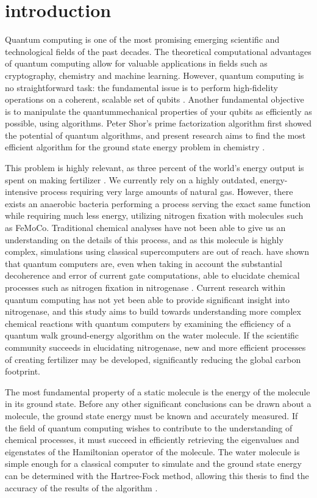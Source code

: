 \chapter{introduction}

Quantum computing is one of the most promising emerging scientific and technological fields of the past decades. The theoretical computational advantages of quantum computing allow for valuable applications in fields such as cryptography, chemistry and machine learning. However, quantum computing is no straightforward task: the fundamental issue is to perform high-fidelity operations on a coherent, scalable set of qubits \cite{malley}. Another fundamental objective is to manipulate the quantummechanical properties of your qubits as efficiently as possible, using algorithms. Peter Shor's prime factorization algorithm first showed the potential of quantum algorithms, and present research aims to find the most efficient algorithm for the ground state energy problem in chemistry \cite{shor}.


This problem is highly relevant, as three percent of the world's energy output is spent on making fertilizer \cite{reiher}. We currently rely on a highly outdated, energy-intensive process requiring very large amounts of natural gas. However, there exists an anaerobic bacteria performing a process serving the exact same function while requiring much less energy, utilizing nitrogen fixation with molecules such as FeMoCo. Traditional chemical analyses have not been able to give us an understanding on the details of this process, and as this molecule is highly complex, simulations using classical supercomputers are out of reach. \textcite{reiher} have shown that quantum computers are, even when taking in account the substantial decoherence and error of current gate computations, able to elucidate chemical processes such as nitrogen fixation in nitrogenase \cite{reiher}. Current research within quantum computing has not yet been able to provide significant insight into nitrogenase, and this study aims to build towards understanding more complex chemical reactions with quantum computers by examining the efficiency of a quantum walk ground-energy algorithm on the water molecule. If the scientific community succeeds in elucidating nitrogenase, new and more efficient processes of creating fertilizer may be developed, significantly reducing the global carbon footprint.


The most fundamental property of a static molecule is the energy of the  molecule in its ground state. Before any other significant conclusions can be drawn about a molecule, the ground state energy must be known and accurately measured. If the field of quantum computing wishes to contribute to the understanding of chemical processes, it must succeed in efficiently retrieving the eigenvalues and eigenstates of the Hamiltonian operator of the molecule. The water molecule is simple enough for a classical computer to simulate and the ground state energy can be determined with the Hartree-Fock method, allowing this thesis to find the accuracy of the results of the algorithm \cite{smith}.

